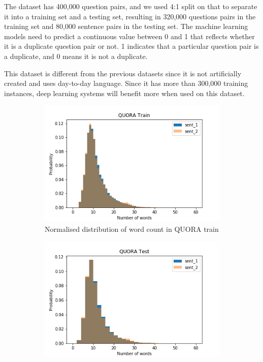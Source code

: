 \begin{enumerate}
The dataset has 400,000 question pairs, and we used 4:1 split on that to separate it into a training set and a testing set, resulting in 320,000 questions pairs in the training set and  80,000 sentence pairs in the testing set. The machine learning models need to predict a continuous value between 0 and 1 that reflects whether it is a duplicate question pair or not. 1 indicates that a particular question pair is a duplicate, and 0 means it is not a duplicate. 


This dataset is different from the previous datasets since it is not artificially created and uses day-to-day language. Since it has more than 300,000 training instances, deep learning systems will benefit more when used on this dataset. 


\begin{figure}
	\captionsetup[subfigure]{justification=centering}
	\centering
	\begin{subfigure}[b]{.5\textwidth}
		\centering
		\includegraphics[width=\textwidth]{figures/semantic_textual_similarity/introduction/quora_train_words.png}
		\caption{Normalised distribution of word count in QUORA train}
		\label{fig:quora_train_words}
	\end{subfigure}%
	\begin{subfigure}[b]{.5\textwidth}
		\centering
		\includegraphics[width=\textwidth]{figures/semantic_textual_similarity/introduction/quora_test_words.png}

\end{subfigure}
\end{figure}
\end{enumerate}

